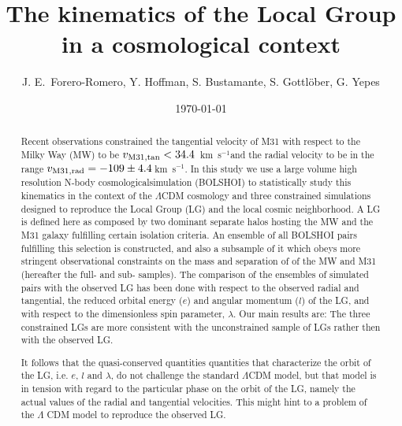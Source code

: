 \documentclass{emulateapj}
\newcommand{\kms}{\,km~s$^{-1}$}
\begin{document}
\title{The kinematics of the Local Group in a cosmological context}
\author{
J. E.\ Forero-Romero, 
Y. Hoffman, 
S. Bustamante, 
S. Gottl\"ober, 
G. Yepes
}


\date{\today}

\begin{abstract}
Recent observations constrained the tangential velocity of M31 with
respect to the Milky Way (MW) to be $v_{\rm M31,tan}<34.4$ \kms and
the radial velocity to be in the range $v_{\rm M31,rad}=-109\pm
4.4$\kms \citep{vanderMarel12}. In this study we use a large volume
high resolution N-body cosmologicalsimulation (BOLSHOI) to
statistically study this kinematics in the context of the $\Lambda$CDM
cosmology and three constrained simulations designed to reproduce the
Local Group (LG) and the local cosmic neighborhood. A LG is defined
here as  composed by two dominant separate halos hosting the MW and
the M31 galaxy fulfilling certain isolation criteria. An ensemble  of
all BOLSHOI pairs fulfilling this selection is constructed, and also a
subsample of it which obeys  more stringent observational constraints
on the mass and separation of of the MW and M31 (hereafter the full-
and sub- samples). The comparison of the ensembles of simulated pairs
with the observed LG has been done with respect to the observed radial
and tangential,  the reduced orbital energy ($e$) and angular momentum
($l$) of the LG, and with respect to the dimensionless spin parameter,
$\lambda$. Our main results are: 
%
%
%
The three constrained LGs are more consistent with the unconstrained
sample of LGs rather then with the observed LG. 

It follows that the quasi-conserved quantities quantities that
characterize the orbit of the LG, i.e. $e$, $l$ and $\lambda$, do not
challenge the standard $\Lambda$CDM model, but that model is in
tension with regard to the particular phase on the orbit of the LG,
namely the actual values of the radial and tangential velocities. This
might hint to a problem of the $\Lambda$ CDM model to reproduce the
observed LG.  

\end{abstract}
\end{document}
